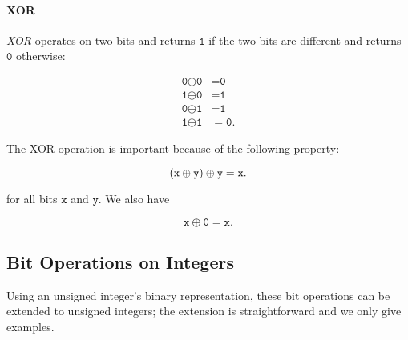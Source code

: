\paragraph{XOR}
\emph{XOR} operates on two bits and returns $\texttt{1}$
if the two bits are different and returns $\texttt{0}$ otherwise:

\begin{align}
    \texttt{0}\oplus\texttt{0} &= \texttt{0} \nonumber\\
    \texttt{1}\oplus\texttt{0} &= \texttt{1} \nonumber\\
    \texttt{0}\oplus\texttt{1} &= \texttt{1} \nonumber\\
    \texttt{1}\oplus\texttt{1} &= \texttt{0}.
\end{align}

\noindent
The XOR operation is important because of the following property:

\begin{equation}
    \left( \texttt{x} \oplus \texttt{y} \right) \oplus \texttt{y} = \texttt{x}.
\end{equation}

\noindent
for all bits $\texttt{x}$ and $\texttt{y}$.
We also have

\begin{equation}
    \texttt{x} \oplus \texttt{0} = \texttt{x}.
\end{equation}

\subsection{Bit Operations on Integers}

Using an unsigned integer's binary representation,
these bit operations can be extended to unsigned integers;
the extension is straightforward and we only give examples.


